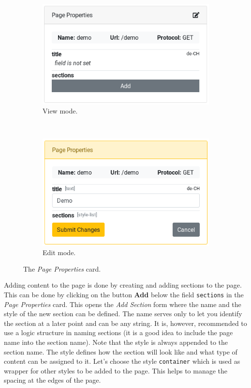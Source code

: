 \documentclass[a4paper,oneside]{book}
\begin{document}
\begin{figure}[ht]
    \centering
    \begin{subfigure}[b]{0.49\textwidth}
        \includegraphics[width=\textwidth]{page_properties.png}
        \caption{View mode.}
        \label{fig.page_properties_view}
    \end{subfigure}
    ~
    \begin{subfigure}[b]{0.49\textwidth}
        \includegraphics[width=\textwidth]{page_properties_edit.png}
        \caption{Edit mode.}
        \label{fig.page_properties_edit}
    \end{subfigure}
    \caption{The \emph{Page Properties} card.}
    \label{fig.page_properties}
\end{figure}

Adding content to the page is done by creating and adding sections to the page.
This can be done by clicking on the button \textbf{Add} below the field \texttt{sections} in the \emph{Page Properties} card.
This opens the \emph{Add Section} form where the name and the style of the new section can be defined.
The name serves only to let you identify the section at a later point and can be any string.
It is, however, recommended to use a logic structure in naming sections (it is a good idea to include the page name into the section name).
Note that the style is always appended to the section name.
The style defines how the section will look like and what type of content can be assigned to it.
Let's choose the style \texttt{container} which is used as wrapper for other styles to be added to the page.
This helps to manage the spacing at the edges of the page.
\end{document}
